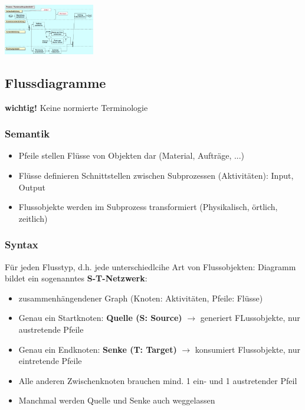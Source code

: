\documentclass{report}
\newenvironment{Figure}
	{\par\medskip\noindent\minipage{\linewidth}}
	{\endminipage\par\medskip}
\theoremstyle{definition}
\theoremstyle{example}
\begin{document}
\begin{Figure}
\centering
\includegraphics[width=150px]{img/BspSwimlane.png}
	\label{fig:Beispiel eines Swimlane-Diagramm}
\end{Figure}

   \subsection{Flussdiagramme}
\textbf{wichtig!} Keine normierte Terminologie\\

      \subsubsection{Semantik}
\begin{itemize}
   \item Pfeile stellen Flüsse von Objekten dar (Material, Aufträge, ...)
   \item Flüsse definieren Schnittstellen zwischen Subprozessen (Aktivitäten): Input, Output
   \item Flussobjekte werden im Subprozess transformiert (Physikalisch, örtlich, zeitlich)
\end{itemize}

      \subsubsection{Syntax}
Für jeden Flusstyp, d.h. jede unterschiedlcihe Art von Flussobjekten: Diagramm bildet ein sogenanntes \textbf{S-T-Netzwerk}:
\begin{itemize}
   \item zusammenhängendener Graph (Knoten: Aktivitäten, Pfeile: Flüsse)
   \item Genau ein Startknoten: \textbf{Quelle (S: Source)} $\rightarrow$ generiert FLussobjekte, nur austretende Pfeile
   \item Genau ein Endknoten: \textbf{Senke (T: Target)} $\rightarrow$ konsumiert Flussobjekte, nur eintretende Pfeile
   \item Alle anderen Zwischenknoten brauchen mind. 1 ein- und 1 austretender Pfeil
   \item Manchmal werden Quelle und Senke auch weggelassen
\end{itemize}
\end{document}
